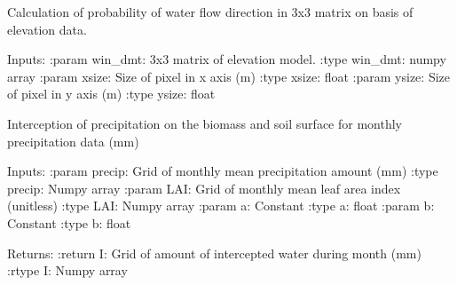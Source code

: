 \documentclass[letterpaper,10pt,english]{sphinxmanual}
\begin{document}
\begin{fulllineitems}
\begin{fulllineitems}
\begin{quote}
\begin{description}
\end{description}\end{quote}

\end{fulllineitems}


\begin{fulllineitems}
\label{\detokenize{libs:waterflow.WaterBalance.flowProbab}}
Calculation of probability of water flow direction in 3x3 matrix
on basis of elevation data.

Inputs:
:param win\_dmt: 3x3 matrix of elevation model.
:type win\_dmt: numpy array
:param xsize: Size of pixel in x axis (m)
:type xsize: float
:param ysize: Size of pixel in y axis (m)
:type ysize: float

\end{fulllineitems}


\begin{fulllineitems}
\label{\detokenize{libs:waterflow.WaterBalance.interceptWater}}
Interception of precipitation on the biomass and soil surface 
for monthly precipitation data (mm)

Inputs:
:param precip: Grid of monthly mean precipitation amount (mm)
:type precip: Numpy array
:param LAI: Grid of monthly mean leaf area index (unitless)
:type LAI: Numpy array
:param a: Constant
:type a: float
:param b: Constant
:type b: float

Returns:
:return I: Grid of amount of intercepted water during month (mm)
:rtype I: Numpy array

\end{fulllineitems}



\end{fulllineitems}
\end{document}
